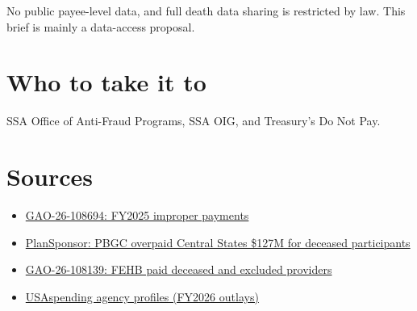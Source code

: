 \documentclass[letterpaper,11pt]{article}
\providecommand{\tightlist}{\setlength{\itemsep}{0pt}\setlength{\parskip}{0pt}}
\begin{document}
No public payee-level data, and full death data sharing is restricted by
law. This brief is mainly a data-access proposal.

\hypertarget{who-to-take-it-to}{%
\section{Who to take it to}\label{who-to-take-it-to}}

SSA Office of Anti-Fraud Programs, SSA OIG, and Treasury's Do Not Pay.

\hypertarget{sources}{%
\section{Sources}\label{sources}}

\begin{itemize}
\tightlist
\item
  \href{https://www.gao.gov/products/gao-26-108694}{GAO-26-108694:
  FY2025 improper payments}
\item
  \href{https://www.plansponsor.com/pbgc-says-central-states-will-reimburse-sfa-overpayment/}{PlanSponsor:
  PBGC overpaid Central States \$127M for deceased participants}
\item
  \href{https://files.gao.gov/reports/GAO-26-108139/index.html}{GAO-26-108139:
  FEHB paid deceased and excluded providers}
\item
  \href{https://www.usaspending.gov/agency}{USAspending agency profiles
  (FY2026 outlays)}
\end{itemize}
\end{document}
